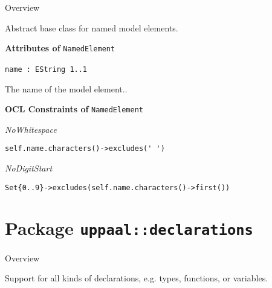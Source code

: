 	\begin{longdescription}
		\item[Overview] 		
				

	

		Abstract base class for named model elements.		
		
	
			\item[\textbf{Attributes of} \texttt{NamedElement}] ~
			\begin{longdescription}
	\item[\texttt{name : EString 	\symbol{"5B}1..1\symbol{"5D}
}] ~
	
	
	\nopagebreak
		
				

	

		The name of the model element..		
			\end{longdescription}
			\item[\textbf{OCL Constraints of} \texttt{NamedElement}] ~
			\begin{longdescription}
	\item[\small\textit{NoWhitespace}] ~ 
	\nopagebreak
	
		\begin{lstlisting}[breaklines=true]
self.name.characters()->excludes(' ')		\end{lstlisting}
	\item[\small\textit{NoDigitStart}] ~ 
	\nopagebreak
	
		\begin{lstlisting}[breaklines=true]
Set{0..9}->excludes(self.name.characters()->first())		\end{lstlisting}
			\end{longdescription}
	
	\end{longdescription}
	
			\newpage
		\section{Package \bfseries \texttt{uppaal::declarations}\normalfont}
		
		\begin{longdescription}
		\item[Overview]			
				

	

		Support for all kinds of declarations, e.g. types, functions, or variables.		
		\end{longdescription}
	

